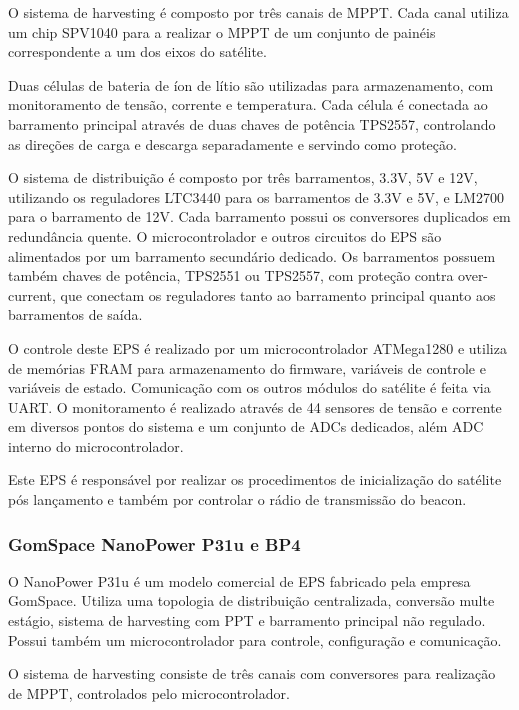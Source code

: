 O sistema de harvesting é composto por três canais de \gls{MPPT}. Cada canal utiliza um chip SPV1040 para a realizar o \gls{MPPT} de um conjunto de painéis correspondente a um dos eixos do satélite.

Duas células de bateria de íon de lítio são utilizadas para armazenamento, com monitoramento de tensão, corrente e temperatura. Cada célula é conectada ao barramento principal através de duas chaves de potência TPS2557, controlando as direções de carga e descarga separadamente e servindo como proteção.

O sistema de distribuição é composto por três barramentos, 3.3V, 5V e 12V, utilizando os reguladores LTC3440 para os barramentos de 3.3V e 5V, e LM2700 para o barramento de 12V.
Cada barramento possui os conversores duplicados em redundância quente.
O microcontrolador e outros circuitos do \gls{EPS} são alimentados por um barramento secundário dedicado.
Os barramentos possuem também chaves de potência, TPS2551 ou TPS2557, com proteção contra over-current, que conectam os reguladores tanto ao barramento principal quanto aos barramentos de saída.

O controle deste \gls{EPS} é realizado por um microcontrolador ATMega1280 e utiliza de memórias FRAM para armazenamento do firmware, variáveis de controle e variáveis de estado.
Comunicação com os outros módulos do satélite é feita via \gls{UART}.
O monitoramento é realizado através de 44 sensores de tensão e corrente em diversos pontos do sistema e um conjunto de ADCs dedicados, além ADC interno do microcontrolador.

Este \gls{EPS} é responsável por realizar os procedimentos de inicialização do satélite pós lançamento e também por controlar o rádio de transmissão do beacon.




\subsubsection{GomSpace NanoPower P31u e BP4}

O NanoPower P31u \cite{p31u-datasheet} é um modelo comercial de \gls{EPS} fabricado pela empresa GomSpace. Utiliza uma topologia de distribuição centralizada, conversão multe estágio, sistema de harvesting com \gls{PPT} e barramento principal não regulado. Possui também um microcontrolador para controle, configuração e comunicação.

O sistema de harvesting consiste de três canais com conversores para realização de \gls{MPPT}, controlados pelo microcontrolador.

